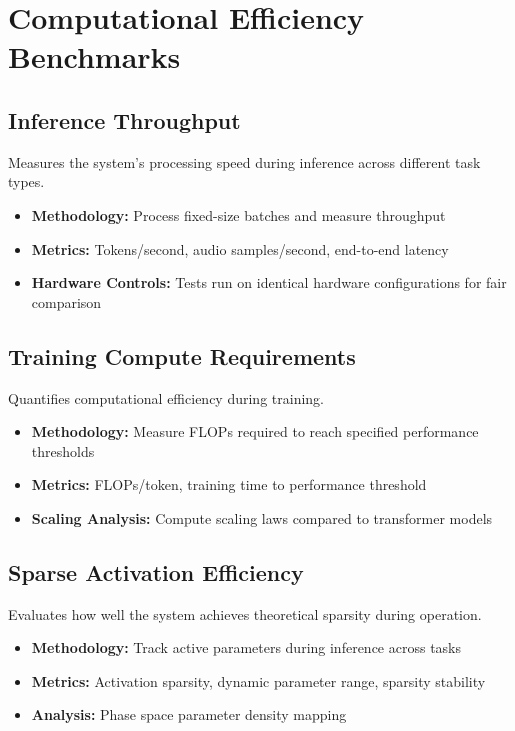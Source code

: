 \section{Computational Efficiency Benchmarks}

\subsection{Inference Throughput}

Measures the system's processing speed during inference across different task types.

\begin{itemize}
    \item \textbf{Methodology:} Process fixed-size batches and measure throughput
    \item \textbf{Metrics:} Tokens/second, audio samples/second, end-to-end latency
    \item \textbf{Hardware Controls:} Tests run on identical hardware configurations for fair comparison
\end{itemize}

\subsection{Training Compute Requirements}

Quantifies computational efficiency during training.

\begin{itemize}
    \item \textbf{Methodology:} Measure FLOPs required to reach specified performance thresholds
    \item \textbf{Metrics:} FLOPs/token, training time to performance threshold
    \item \textbf{Scaling Analysis:} Compute scaling laws compared to transformer models
\end{itemize}

\subsection{Sparse Activation Efficiency}

Evaluates how well the system achieves theoretical sparsity during operation.

\begin{itemize}
    \item \textbf{Methodology:} Track active parameters during inference across tasks
    \item \textbf{Metrics:} Activation sparsity, dynamic parameter range, sparsity stability
    \item \textbf{Analysis:} Phase space parameter density mapping
\end{itemize}

